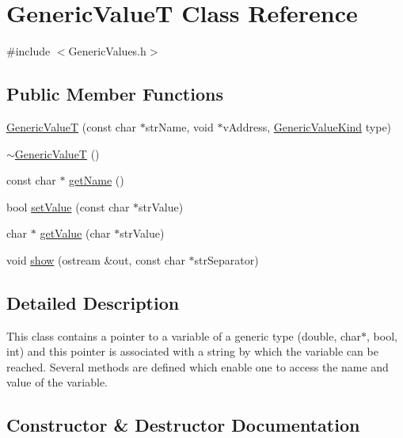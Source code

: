 \hypertarget{classGenericValueT}{}\section{Generic\+ValueT Class Reference}
\label{classGenericValueT}


{\ttfamily \#include $<$Generic\+Values.\+h$>$}

\subsection*{Public Member Functions}
\begin{DoxyCompactItemize}
\item 
\hyperlink{classGenericValueT_ae981c3fcf117e0ae1e75f010ba70679a}{Generic\+ValueT} (const char $\ast$str\+Name, void $\ast$v\+Address, \hyperlink{GenericValues_8h_aaecaa3e46488aab71938a199e362d0c6}{Generic\+Value\+Kind} type)
\item 
\hyperlink{classGenericValueT_ae0fa31bea8447c2813fcff0ef0bc0b86}{$\sim$\+Generic\+ValueT} ()
\item 
const char $\ast$ \hyperlink{classGenericValueT_a8227b5d78661ecfb9b555efa81773433}{get\+Name} ()
\item 
bool \hyperlink{classGenericValueT_a9bfff0e65af37b47f1d337c7e7147967}{set\+Value} (const char $\ast$str\+Value)
\item 
char $\ast$ \hyperlink{classGenericValueT_aa59bff94a401fbc93dd2f2153ebfd378}{get\+Value} (char $\ast$str\+Value)
\item 
void \hyperlink{classGenericValueT_a540252081fae8402bf65016ac20baf9a}{show} (ostream \&out, const char $\ast$str\+Separator)
\end{DoxyCompactItemize}


\subsection{Detailed Description}
This class contains a pointer to a variable of a generic type (double, char$\ast$, bool, int) and this pointer is associated with a string by which the variable can be reached. Several methods are defined which enable one to access the name and value of the variable. 

\subsection{Constructor \& Destructor Documentation}
